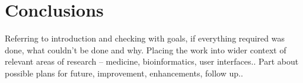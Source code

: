 \chapter{Conclusions}
Referring to introduction and checking with goals, if everything required was
done, what couldn't be done and why. Placing the work into wider context of
relevant areas of research -- medicine, bioinformatics, user interfaces..
Part about possible plans for future, improvement, enhancements, follow
up..
